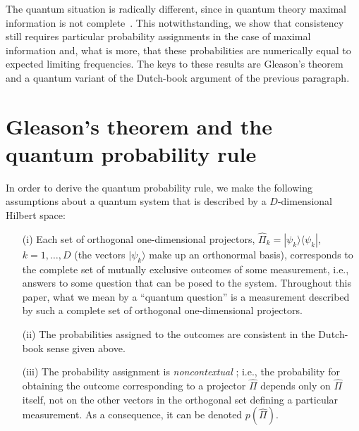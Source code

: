 The quantum situation is radically different, since in quantum theory
maximal information is not complete~\cite{Israel}.  This
notwithstanding, we show that consistency still requires particular
probability assignments in the case of maximal information and, what
is more, that these probabilities are numerically equal to expected
limiting frequencies.  The keys to these results are Gleason's
theorem and a quantum variant of the Dutch-book argument of the
previous paragraph.

\section{Gleason's theorem and the quantum probability rule}

In order to derive the quantum probability rule, we make the
following assumptions about a quantum system that is described by a
$D$-dimensional Hilbert space:

\begin{itemize}
\item[(i)]Each set of orthogonal one-dimensional projectors,
$\hat\Pi_k=|\psi_k\rangle\langle\psi_k|$, $k=1,\ldots,D$ (the vectors
$|\psi_k\rangle$ make up an orthonormal basis), corresponds to the
complete set of mutually exclusive outcomes of some measurement,
i.e., answers to some question that can be posed to the system.
Throughout this paper, what we mean by a ``quantum question'' is a
measurement described by such a complete set of orthogonal
one-dimensional projectors.

\item[(ii)]The probabilities assigned to the outcomes are
consistent in the Dutch-book sense given above.

\item[(iii)]The probability assignment is {\it noncontextual\/}
\cite{Barnum}; i.e., the probability for obtaining the outcome
corresponding to a projector $\hat\Pi$ depends only on $\hat\Pi$
itself, not on the other vectors in the orthogonal set defining a
particular measurement.  As a consequence, it can be denoted
$p(\hat\Pi)$.
\end{itemize}

